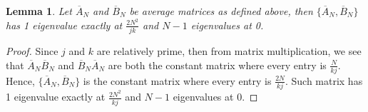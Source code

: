 \documentclass[11pt,reqno]{amsart}
\numberwithin{equation}{section}
\theoremstyle{plain}
\newtheorem{lemma}[thm]{Lemma}
\begin{document}

\begin{lemma}
Let $\overline{A}_N$ and $\overline{B}_N$ be average matrices as defined above, then $\{\overline{A}_N, \overline{B}_N\}$ has 1 eigenvalue exactly at $\frac{2N^2}{jk}$ and $N-1$ eigenvalues at 0.
\end{lemma}
\begin{proof}
Since $j$ and $k$ are relatively prime, then from matrix multiplication, we see that $\overline{A}_N\overline{B}_N$ and $\overline{B}_N\overline{A}_N$ are both the constant matrix where every entry is $\frac{N}{kj}$. Hence, $\{\overline{A}_N, \overline{B}_N\}$ is the constant matrix where every entry is $\frac{2N}{kj}$. Such matrix has 1 eigenvalue exactly at $\frac{2N^2}{kj}$ and $N-1$ eigenvalues at $0$.  
\end{proof}
\end{document}
